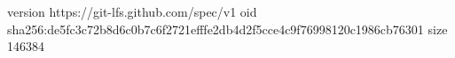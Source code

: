 version https://git-lfs.github.com/spec/v1
oid sha256:de5fc3c72b8d6c0b7c6f2721efffe2db4d2f5cce4c9f76998120c1986cb76301
size 146384
